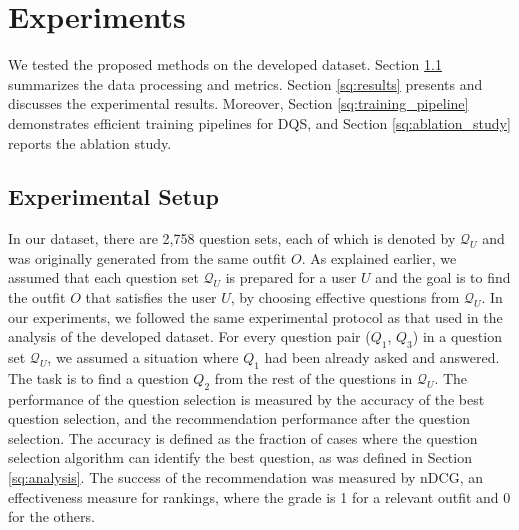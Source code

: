 \chapter{Experiments}
\label{sq:experiments}

We tested the proposed methods on the developed dataset. Section \ref{sq:experimental_setup} summarizes the data processing and metrics. Section \ref{sq:results} presents and discusses the experimental results. Moreover, 
Section \ref{sq:training_pipeline} demonstrates 
efficient training pipelines for DQS,
and Section \ref{sq:ablation_study} reports the ablation study.

\section{Experimental Setup}
\label{sq:experimental_setup}

In our dataset, there are 2,758 question sets,
each of which is denoted by $\mathcal{Q}_U$ and was originally generated from the same outfit $O$. 
As explained earlier, we assumed that each question set $\mathcal{Q}_U$ is prepared for a user $U$
and the goal is to find the outfit $O$ that satisfies the user $U$,
by choosing effective questions from $\mathcal{Q}_U$.
In our experiments, we followed the same experimental protocol 
as that used in the analysis of the developed dataset.
For every question pair ($Q_1$, $Q_3$) in a question set $\mathcal{Q}_U$, we assumed a situation where $Q_1$ had been already asked and answered. 
The task is to find a question $Q_2$ from the rest of the questions in 
$\mathcal{Q}_U$.
The performance of the question selection is measured by 
the accuracy of the best question selection,
and the recommendation performance after the question selection.
The accuracy is defined as the fraction of cases where the question selection algorithm can identify the best question, as was defined in Section \ref{sq:analysis}.
The success of the recommendation was measured by nDCG,
an effectiveness measure for rankings,
where the grade is 1 for a relevant outfit and 0 for the others. 


